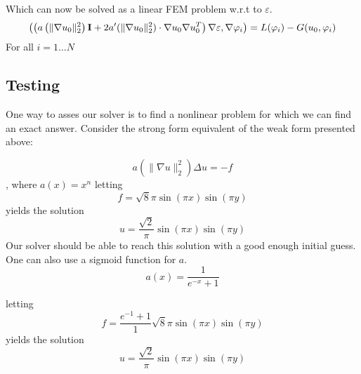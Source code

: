 \documentclass[a4paper]{article}
\begin{document}
Which can now be solved as a linear FEM problem w.r.t to $\varepsilon$.
\begin{equation}
\left( \left(a\left(\|\nabla u_0 \|_2^2\right)\mathbf{I}+2a'(\|\nabla u_0\|_2^2)\cdot \nabla u_0 \nabla u_0^T\right)\nabla \varepsilon,\nabla \varphi_i \right) = L(\varphi_i)-G(u_0,\varphi_i) \\
\end{equation}
For all $i=1\ldots N$

\subsection*{Testing}
One way to asses our solver is to find a nonlinear problem for which we can find an exact answer. 
Consider the strong form equivalent of the weak form presented above:

\begin{equation*}
a\left(\|\nabla u \|_2^2\right)\Delta u = -f 
\end{equation*},
where $a(x)=x^n$
letting
\begin{equation*}
	f = \sqrt{8}\pi \sin(\pi x)\sin(\pi y)  
\end{equation*}
yields the solution
\begin{equation*}
	u = \frac{\sqrt{2}}{\pi} \sin(\pi x)\sin(\pi y)
\end{equation*}
Our solver should be able to reach this solution with a good enough initial guess.
One can also use a sigmoid function for $a$.
\begin{equation*}
	a(x)=\frac{1}{e^{-x}+1}
\end{equation*}


letting
\begin{equation*}
	f = \frac{e^{-1}+1}{1}\sqrt{8}\pi \sin(\pi x)\sin(\pi y)  
\end{equation*}
yields the solution
\begin{equation*}
	u = \frac{\sqrt{2}}{\pi} \sin(\pi x)\sin(\pi y)
\end{equation*}




\clearpage
%
\end{document}
